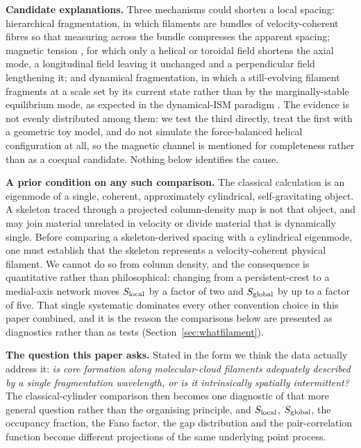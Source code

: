 \documentclass[usenatbib,twoside,twocolumn]{mnras}
\begin{document}
\smallskip\noindent\textbf{Candidate explanations.} Three mechanisms could shorten a local spacing: hierarchical fragmentation, in which filaments are bundles of velocity-coherent fibres \citep{Hacar2013,Hacar2018,Yang2024} so that measuring across the bundle compresses the apparent spacing; magnetic tension \citep{Nakamura1993}, for which only a helical or toroidal field shortens the axial mode, a longitudinal field leaving it unchanged and a perpendicular field lengthening it; and dynamical fragmentation, in which a still-evolving filament fragments at a scale set by its current state rather than by the marginally-stable equilibrium mode, as expected in the dynamical-ISM paradigm \citep{Andre2014,Clarke2016,Clarke2017,Clarke2020}. The evidence is not evenly distributed among them: we test the third directly, treat the first with a geometric toy model, and do not simulate the force-balanced helical configuration at all, so the magnetic channel is mentioned for completeness rather than as a coequal candidate. Nothing below identifies the cause.

\smallskip\noindent\textbf{A prior condition on any such comparison.} The classical calculation is an eigenmode of a single, coherent, approximately cylindrical, self-gravitating object. A skeleton traced through a projected column-density map is not that object, and may join material unrelated in velocity or divide material that is dynamically single. Before comparing a skeleton-derived spacing with a cylindrical eigenmode, one must establish that the skeleton represents a velocity-coherent physical filament. We cannot do so from column density, and the consequence is quantitative rather than philosophical: changing from a persistent-crest to a medial-axis network moves $S_{\rm local}$ by a factor of two and $S_{\rm global}$ by up to a factor of five. That single systematic dominates every other convention choice in this paper combined, and it is the reason the comparisons below are presented as diagnostics rather than as tests (Section~\ref{sec:whatfilament}).

\smallskip\noindent\textbf{The question this paper asks.} Stated in the form we think the data actually address it: \emph{is core formation along molecular-cloud filaments adequately described by a single fragmentation wavelength, or is it intrinsically spatially intermittent?} The classical-cylinder comparison then becomes one diagnostic of that more general question rather than the organising principle, and $S_{\rm local}$, $S_{\rm global}$, the occupancy fraction, the Fano factor, the gap distribution and the pair-correlation function become different projections of the same underlying point process.
\end{document}
